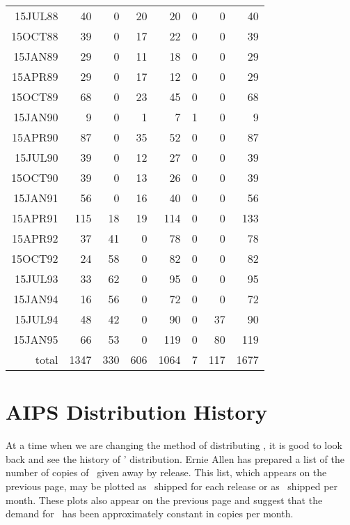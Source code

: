{\begin{center}
\begin{tabular}{rrrrrrrr}
15JUL88&   40&   0&   20&   20&      0&      0&    40 \\
15OCT88&   39&   0&   17&   22&      0&      0&    39 \\
15JAN89&   29&   0&   11&   18&      0&      0&    29 \\
15APR89&   29&   0&   17&   12&      0&      0&    29 \\
15OCT89&   68&   0&   23&   45&      0&      0&    68 \\
15JAN90&    9&   0&    1&    7&      1&      0&     9 \\
15APR90&   87&   0&   35&   52&      0&      0&    87 \\
15JUL90&   39&   0&   12&   27&      0&      0&    39 \\
15OCT90&   39&   0&   13&   26&      0&      0&    39 \\
15JAN91&   56&   0&   16&   40&      0&      0&    56 \\
15APR91&  115&  18&   19&  114&      0&      0&   133 \\
15APR92&   37&  41&    0&   78&      0&      0&    78 \\
15OCT92&   24&  58&    0&   82&      0&      0&    82 \\
15JUL93&   33&  62&    0&   95&      0&      0&    95 \\
15JAN94&   16&  56&    0&   72&      0&      0&    72 \\
15JUL94&   48&  42&    0&   90&      0&     37&    90 \\
15JAN95&   66&  53&    0&  119&      0&     80&   119 \\ \hline
total  & 1347& 330&  606& 1064&      7&    117&  1677
\end{tabular}
\end{center}
}
\vfill\eject

\section{AIPS Distribution History}

At a time when we are changing the method of distributing \AIPS, it is
good to look back and see the history of \AIPS' distribution.  Ernie
Allen has prepared a list of the number of copies of \AIPS\ given away
by release.  This list, which appears on the previous page, may be
plotted as \AIPS\ shipped for each release or as \AIPS\ shipped per
month.  These plots also appear on the previous page and suggest that
the demand for \AIPS\ has been approximately constant in copies per
month.

